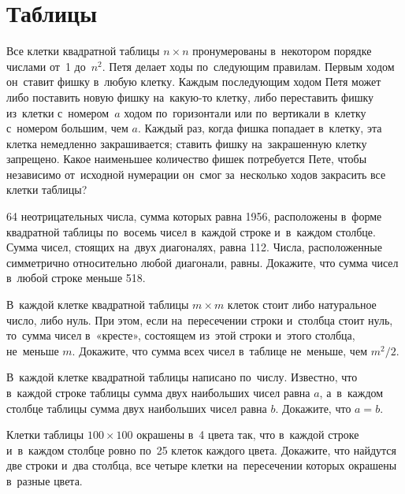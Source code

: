 

\section*{Таблицы}


\begin{problems}

\item
Все клетки квадратной таблицы $n \times n$ пронумерованы в~некотором порядке
числами от~1 до~$n^2$.
Петя делает ходы по~следующим правилам.
Первым ходом он~ставит фишку в~любую клетку.
Каждым последующим ходом Петя может либо поставить новую фишку на~какую-то
клетку, либо переставить фишку из~клетки с~номером~$a$ ходом по~горизонтали или
по~вертикали в~клетку с~номером большим, чем $a$.
Каждый раз, когда фишка попадает в~клетку, эта клетка немедленно закрашивается;
ставить фишку на~закрашенную клетку запрещено.
Какое наименьшее количество фишек потребуется Пете, чтобы независимо
от~исходной нумерации он~смог за~несколько ходов закрасить все клетки таблицы?

\item
64 неотрицательных числа, сумма которых равна 1956, расположены в~форме
квадратной таблицы по~восемь чисел в~каждой строке и~в~каждом столбце.
Сумма чисел, стоящих на~двух диагоналях, равна 112.
Числа, расположенные симметрично относительно любой диагонали, равны.
Докажите, что сумма чисел в~любой строке меньше 518.

\item
В~каждой клетке квадратной таблицы $m \times m$ клеток стоит либо натуральное
число, либо нуль.
При этом, если на~пересечении строки и~столбца стоит нуль, то~сумма чисел
в~«кресте», состоящем из~этой строки и~этого столбца, не~меньше $m$.
Докажите, что сумма всех чисел в~таблице не~меньше, чем $m^2 / 2$.

\item
В~каждой клетке квадратной таблицы написано по~числу.
Известно, что в~каждой строке таблицы сумма двух наибольших чисел равна $a$,
а~в~каждом столбце таблицы сумма двух наибольших чисел равна $b$.
Докажите, что $a = b$.

\item
Клетки таблицы $100 \times 100$ окрашены в~4 цвета так, что в~каждой строке
и~в~каждом столбце ровно по~25 клеток каждого цвета.
Докажите, что найдутся две строки и~два столбца, все четыре клетки
на~пересечении которых окрашены в~разные цвета.


\end{problems}

